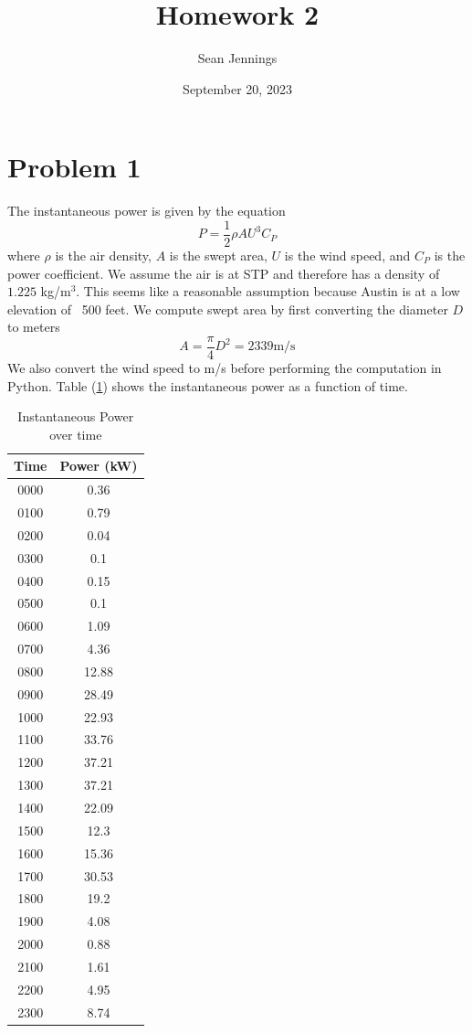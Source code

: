 \documentclass{homework}
\title{Homework 2}
\author{Sean Jennings}
\date{September 20, 2023}
\begin{document}
\maketitle

\section{Problem 1}
\begin{letterenum}
\item The instantaneous power is given by the equation
\begin{equation}
    P = \frac{1}{2} \rho A U^3 C_P
\end{equation}
where $\rho$ is the air density, $A$ is the swept area,
$U$ is the wind speed, and $C_P$ is the power coefficient.
We assume the air is at STP and therefore has a density of
$1.225$ kg/m$^3$. This seems like a reasonable assumption because Austin
is at a low elevation of ~500 feet. We compute swept area by first converting
the diameter $D$ to meters
\begin{equation}
    A = \frac{\pi}{4} D^2 = 2339 \text{m/s}
\end{equation}
We also convert the wind speed to m/s before performing the computation
in Python.  Table (\ref{table:powers}) shows the instantaneous power as a function of
time.
\begin{table}[h!]
\centering
\begin{tabular}{ |c|c|}
\hline
Time & Power (kW) \\
\hline
0000 & 0.36 \\
0100 & 0.79 \\
0200 & 0.04 \\
0300 & 0.1 \\
0400 & 0.15 \\
0500 & 0.1 \\
0600 & 1.09 \\
0700 & 4.36 \\
0800 & 12.88 \\
0900 & 28.49 \\
1000 & 22.93 \\
1100 & 33.76 \\
1200 & 37.21 \\
1300 & 37.21 \\
1400 & 22.09 \\
1500 & 12.3 \\
1600 & 15.36 \\
1700 & 30.53 \\
1800 & 19.2 \\
1900 & 4.08 \\
2000 & 0.88 \\
2100 & 1.61 \\
2200 & 4.95 \\
2300 & 8.74 \\
\hline
\end{tabular}
\caption{Instantaneous Power over time}
\label{table:powers}
\end{table}


\end{letterenum}
\end{document}
